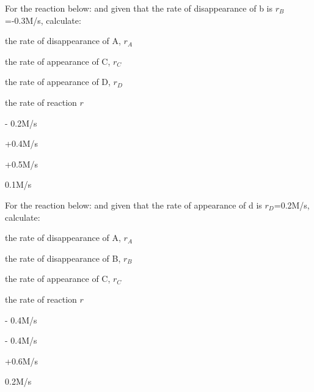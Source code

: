 \documentclass[main.tex]{subfiles}
\begin{document}
\begin{multicols*}{2}
\begin{question}[ID=\the\value{numA}]
For the reaction below: 
and given that the rate of disappearance of b is $r_B$=-0.3M/s, calculate:
\begin{inparaenum}[(a)]
\item  the rate of disappearance of A, $r_A$   %
\item  the rate of appearance of C, $r_C$   %
\item  the rate of appearance of D, $r_D$   %
\item  the rate of reaction $r$   %
\end{inparaenum}
\end{question}
\begin{solution}
\begin{inparaenum}[(a)]
\item   - 0.2M/s
\item   +0.4M/s 
\item    +0.5M/s 
\item    0.1M/s
\end{inparaenum}\hspace{0.1cm}\end{solution}%

      
\begin{question}[ID=\the\value{numA}]
For the reaction below: 
and given that the rate of appearance of d is $r_D$=0.2M/s, calculate:
\begin{inparaenum}[(a)]
\item  the rate of disappearance of A, $r_A$   %
\item  the rate of disappearance of B, $r_B$   %
\item  the rate of appearance of C, $r_C$   %
\item  the rate of reaction $r$   %
\end{inparaenum}
\end{question}
\begin{solution}
\begin{inparaenum}[(a)]
\item    - 0.4M/s
\item    - 0.4M/s
\item    +0.6M/s 
\item    0.2M/s
\end{inparaenum}\hspace{0.1cm}\end{solution}%




\end{multicols*}
\end{document}
